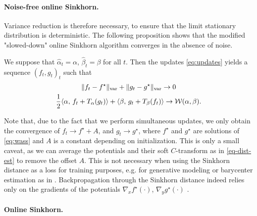 \paragraph{Noise-free online Sinkhorn.}

Variance reduction is therefore necessary, to ensure that the limit stationary
distribution is deterministic. The following proposition shows that the modified "slowed-down" online Sinkhorn algorithm converges in the absence of noise.

\begin{proposition}\label{eq:deterministic}
    We suppose that $\hat \alpha_t = \alpha$, $\hat \beta_t = \beta$ for all
    $t$. Then the updates \eqref{eq:updates} yields a sequence $(f_t, g_t)_t$ such
    that 
    \begin{gather}
        \Vert f_t - f^\star \Vert_{\text{var}} 
        + \Vert g_t - g^\star \Vert_{\text{var}} \to 0 \\
        \frac{1}{2} \langle \alpha,\,f_t + T_{\alpha}(g_t)\rangle + \langle \beta,\,g_t + T_{\beta}(f_t)\rangle 
         \to \mathcal{W}(\alpha, \beta).
    \end{gather}
\end{proposition}
Note that, due to the fact that we perform simultaneous updates, we only obtain
the convergence of $f_t \to f^\star + A$, and $g_t \to g^\star$, where $f^\star$
and $g^\star$ are solutions of \eqref{eq:wass} and $A$ is a constant depending
on initialization. This is only a small caveat, as we can average the potentials
and their soft $C$-transform as in \eqref{eq-dist-est} to remove the offset $A$.
This is not necessary when using the Sinkhorn distance as a loss for training
purposes, e.g. for generative modeling or barycenter estimation as in
\citet{staib2017parallel}. Backpropagation through the Sinkhorn distance indeed
relies only on the gradients of the potentials $\nabla_x f^\star(\cdot)$,
$\nabla_y g^\star(\cdot)$ \citep[e.g.][]{cuturi2018semidual}.
\paragraph{Online Sinkhorn.}

